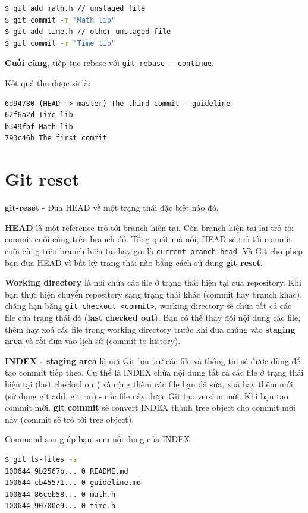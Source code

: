 \documentclass[a4paper, 11pt]{article}
\begin{document}
\begin{lstlisting}[language=bash]
$ git add math.h // unstaged file
$ git commit -m "Math lib"
$ git add time.h // other unstaged file
$ git commit -m "Time lib"
\end{lstlisting}

\textbf{Cuối cùng}, tiếp tục rebase với \texttt{git rebase \texttt{-{}-}continue}.

Kết quả thu được sẽ là:

\begin{verbatim}
6d94780 (HEAD -> master) The third commit - guideline
62f6a2d Time lib
b349fbf Math lib
793c46b The first commit
\end{verbatim}

\clearpage
\section{Git reset}
\textbf{git-reset} - Đưa HEAD về một trạng thái đặc biệt nào đó.

\textbf{HEAD} là một reference trỏ tới branch hiện tại. Còn branch hiện tại lại trỏ tới commit cuối cùng trên branch đó. Tổng quát mà nói, HEAD sẽ trỏ tới commit cuối cùng trên branch hiện tại hay gọi là \texttt{current branch head}. Và Git cho phép bạn đưa HEAD vì bất kỳ trạng thái nào bằng cách sử dụng \textbf{git reset}.

\textbf{Working directory} là nơi chứa các file ở trạng thái hiện tại của repository. Khi bạn thực hiện chuyển repository sang trạng thái khác (commit hay branch khác), chẳng hạn bằng \texttt{git checkout <commit>}, working directory sẽ chứa tất cả các file của trạng thái đó (\textbf{last checked out}). Bạn có thể thay đổi nội dung các file, thêm hay xoá các file trong working directory trước khi đưa chúng vào \textbf{staging area} và rồi đưa vào lịch sử (commit to history).

\textbf{INDEX - staging area} là nơi Git lưu trữ các file và thông tin sẽ được dùng để tạo commit tiếp theo. Cụ thể là INDEX chứa nội dung tất cả các file ở trạng thái hiện tại (last checked out) và cộng thêm các file bạn đã sửa, xoá hay thêm mới (sử dụng git add, git rm) - các file này được Git tạo version mới. Khi bạn tạo commit mới, \textbf{git commit} sẽ convert INDEX thành tree object cho commit mới này (commit sẽ trỏ tới tree object).

Command sau giúp bạn xem nội dung của INDEX.

\begin{lstlisting}[language=bash]
$ git ls-files -s
100644 9b2567b... 0	README.md
100644 cb45571... 0	guideline.md
100644 86ceb58... 0	math.h
100644 90700e9... 0	time.h
\end{lstlisting}
\end{document}
